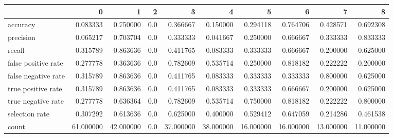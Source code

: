 \begin{tabular}{lrrrrrrrrr}
\toprule
{} &          0 &          1 &    2 &          3 &          4 &          5 &          6 &          7 &          8 \\
\midrule
accuracy            &   0.083333 &   0.750000 &  0.0 &   0.366667 &   0.150000 &   0.294118 &   0.764706 &   0.428571 &   0.692308 \\
precision           &   0.065217 &   0.703704 &  0.0 &   0.333333 &   0.041667 &   0.250000 &   0.666667 &   0.333333 &   0.833333 \\
recall              &   0.315789 &   0.863636 &  0.0 &   0.411765 &   0.083333 &   0.333333 &   0.666667 &   0.200000 &   0.625000 \\
false positive rate &   0.277778 &   0.363636 &  0.0 &   0.782609 &   0.535714 &   0.250000 &   0.818182 &   0.222222 &   0.200000 \\
false negative rate &   0.315789 &   0.863636 &  0.0 &   0.411765 &   0.083333 &   0.333333 &   0.333333 &   0.800000 &   0.625000 \\
true positive rate  &   0.315789 &   0.863636 &  0.0 &   0.411765 &   0.083333 &   0.333333 &   0.666667 &   0.200000 &   0.625000 \\
true negative rate  &   0.277778 &   0.636364 &  0.0 &   0.782609 &   0.535714 &   0.750000 &   0.818182 &   0.222222 &   0.800000 \\
selection rate      &   0.307292 &   0.613636 &  0.0 &   0.625000 &   0.400000 &   0.529412 &   0.647059 &   0.214286 &   0.461538 \\
count               &  61.000000 &  42.000000 &  0.0 &  37.000000 &  38.000000 &  16.000000 &  16.000000 &  13.000000 &  11.000000 \\
\bottomrule
\end{tabular}
